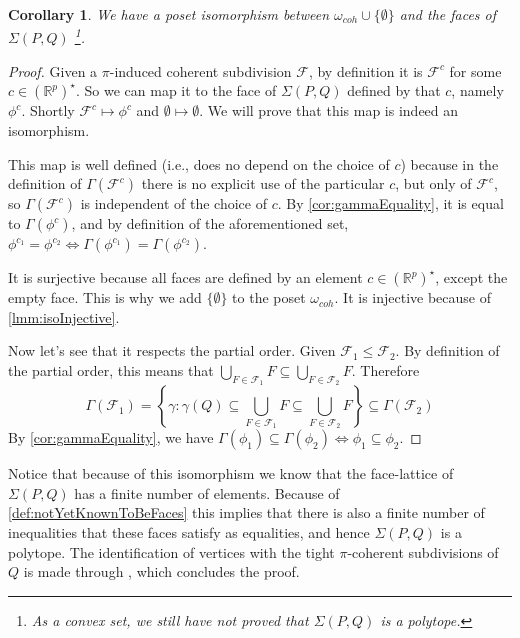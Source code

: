\documentclass[10pt,a4paper]{article}
\newcommand{\RR}{\mathbb{R}}
\theoremstyle{plain}
\newtheorem{corollary}{Corollary}
\theoremstyle{remark}
\theoremstyle{definition}
\begin{document}
\begin{corollary}
    We have a poset isomorphism between 
    $\omega_{coh}\cup \{\emptyset\}$ and the faces of $\Sigma(P,Q)$
    \footnote{As a convex set, we still have not proved that $\Sigma(P,Q)$ is a polytope.}.
\end{corollary}
\begin{proof}
	Given a $\pi$-induced coherent subdivision $\mathcal F$,
	by definition it is $\mathcal{F}^c$ for some $c\in(\RR^p)^\star$.
	So we can map it to the face of $\Sigma(P,Q)$ defined by that $c$, 
	namely $\phi^c$. 
	Shortly $\mathcal{F}^c\mapsto \phi^c$ and 
	$\emptyset\mapsto\emptyset$.
	We will prove that this map is indeed an isomorphism.
	
	This map is well defined 
	(i.e., does no depend on the choice of $c$)
	because in the definition of $\Gamma(\mathcal{F}^c)$
	there is no explicit use of the particular $c$, 
	but only of $\mathcal F^c$, so $\Gamma(\mathcal{F}^c)$ 
	is independent of the choice of $c$.
	By \cref{cor:gammaEquality}, 
	it is equal to $\Gamma(\phi^c)$, 
	and by definition of the aforementioned set,
	$ \phi^{c_1} = \phi^{c_2} \iff
	\Gamma(\phi^{c_1}) = \Gamma(\phi^{c_2})$.
	
	It is surjective because all faces are defined by 
	an element $c\in(\RR^p)^\star$, 
	except the empty face. 
	This is why we add $\{\emptyset \}$ to the poset $\omega_{coh}$.
	It is injective because of \cref{lmm:isoInjective}.

    Now let's see that it respects the partial order.
    Given $\mathcal{F}_1 \leq \mathcal{F}_2$. 
    By definition of the partial order, this means that 
    $\bigcup_{F\in\mathcal{F}_1} F \subseteq \bigcup_{F\in\mathcal{F}_2} F$.
    Therefore
    \begin{equation}
        \Gamma(\mathcal{F}_1) = 
        \left\{ \gamma : \gamma(Q) \subseteq \bigcup_{F\in\mathcal{F}_1} F \subseteq \bigcup_{F\in\mathcal{F}_2} F \right\} 
        \subseteq  \Gamma(\mathcal{F}_2)
    \end{equation} 
    By \cref{cor:gammaEquality}, we have 
    $\Gamma(\phi_1) \subseteq \Gamma(\phi_2) \iff \phi_1 \subseteq \phi_2$.
    
\end{proof}


Notice that because of this isomorphism we know that the face-lattice of $\Sigma(P,Q)$ has a finite number of elements. 
Because of \cref{def:notYetKnownToBeFaces} this implies that there is also a finite number of inequalities that these faces satisfy as equalities, 
and hence $\Sigma(P,Q)$ is a polytope.
The identification of vertices with the tight $\pi$-coherent subdivisions of $Q$ 
is made through \cite[Lemma 9.5]{ziegler2012lectures}, which concludes the proof.
\end{document}
